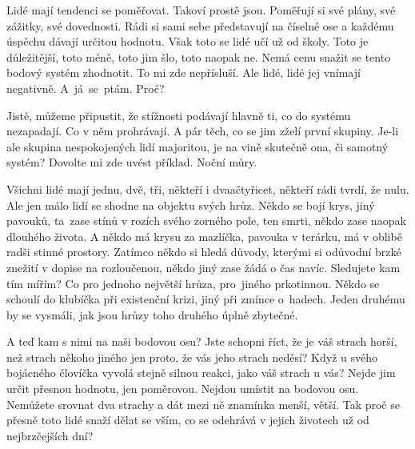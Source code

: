 \documentclass[11pt]{article}
\begin{document}
\setlength{\parindent}{2em}


Lidé mají tendenci se poměřovat. Takoví prostě jsou. Poměřují si své plány, své zážitky, své dovednosti. Rádi si sami sebe představují na číselné ose a každému úspěchu dávají určitou hodnotu. Však toto se lidé učí už od školy. Toto je důležitější, toto méně, toto jim šlo, toto naopak ne. Nemá cenu snažit se tento bodový systém zhodnotit. To mi zde nepřísluší. Ale lidé, lidé jej vnímají negativně. A~já~se~ptám. Proč? \par
Jistě, můžeme připustit, že stížnosti podávají hlavně ti, co do systému nezapadají. Co v něm prohrávají. A pár těch, co se jim zželí první skupiny. Je-li ale skupina nespokojených lidí majoritou, je na vině skutečně ona, či samotný systém? Dovolte mi zde uvést příklad. Noční můry. \par
Všichni lidé mají jednu, dvě, tři, někteří i dvaačtyřicet, někteří rádi tvrdí, že nulu. Ale jen málo lidí se shodne na objektu svých hrůz. Někdo se bojí krys, jiný pavouků, ta~zase stínů v rozích svého zorného pole, ten smrti, někdo zase naopak dlouhého života. A někdo má krysu za mazlíčka, pavouka v terárku, má v oblibě radši stinné prostory. Zatímco někdo si hledá důvody, kterými si odůvodní brzké znežití v dopise na rozloučenou, někdo jiný zase žádá o čas navíc. Sledujete kam tím mířím? Co pro jednoho největší hrůza, pro~jiného prkotinnou. Někdo se schoulí do klubíčka při existenční krizi, jiný při zmínce o~hadech. Jeden druhému by se vysmáli, jak jsou hrůzy toho druhého úplně zbytečné. \par
A teď kam s nimi na naši bodovou osu? Jste schopni říct, že je váš strach horší, než strach někoho jiného jen proto, že vás jeho strach neděsí? Když u svého bojácného človíčka vyvolá stejně silnou reakci, jako váš strach u vás? Nejde jim určit přesnou hodnotu, jen poměrovou. Nejdou umístit na bodovou osu. Nemůžete srovnat dva strachy a dát mezi ně znamínka menší, větší. Tak proč se přesně toto lidé snaží dělat se vším, co se odehrává v jejich životech už od nejbrzčejších dní?
\end{document}
